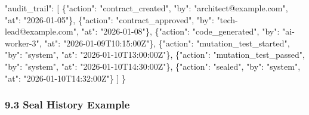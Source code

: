 \documentclass[
]{article}
\newenvironment{Shaded}{}{}
\newcommand{\DataTypeTok}[1]{\textcolor[rgb]{0.56,0.13,0.00}{#1}}
\newcommand{\FunctionTok}[1]{\textcolor[rgb]{0.02,0.16,0.49}{#1}}
\newcommand{\OtherTok}[1]{\textcolor[rgb]{0.00,0.44,0.13}{#1}}
\newcommand{\StringTok}[1]{\textcolor[rgb]{0.25,0.44,0.63}{#1}}
\begin{document}
\begin{Shaded}
\begin{Highlighting}[]
  \DataTypeTok{"audit\_trail"}\FunctionTok{:} \OtherTok{[}
    \FunctionTok{\{}\DataTypeTok{"action"}\FunctionTok{:} \StringTok{"contract\_created"}\FunctionTok{,} \DataTypeTok{"by"}\FunctionTok{:} \StringTok{"architect@example.com"}\FunctionTok{,} \DataTypeTok{"at"}\FunctionTok{:} \StringTok{"2026{-}01{-}05"}\FunctionTok{\}}\OtherTok{,}
    \FunctionTok{\{}\DataTypeTok{"action"}\FunctionTok{:} \StringTok{"contract\_approved"}\FunctionTok{,} \DataTypeTok{"by"}\FunctionTok{:} \StringTok{"tech{-}lead@example.com"}\FunctionTok{,} \DataTypeTok{"at"}\FunctionTok{:} \StringTok{"2026{-}01{-}08"}\FunctionTok{\}}\OtherTok{,}
    \FunctionTok{\{}\DataTypeTok{"action"}\FunctionTok{:} \StringTok{"code\_generated"}\FunctionTok{,} \DataTypeTok{"by"}\FunctionTok{:} \StringTok{"ai{-}worker{-}3"}\FunctionTok{,} \DataTypeTok{"at"}\FunctionTok{:} \StringTok{"2026{-}01{-}09T10:15:00Z"}\FunctionTok{\}}\OtherTok{,}
    \FunctionTok{\{}\DataTypeTok{"action"}\FunctionTok{:} \StringTok{"mutation\_test\_started"}\FunctionTok{,} \DataTypeTok{"by"}\FunctionTok{:} \StringTok{"system"}\FunctionTok{,} \DataTypeTok{"at"}\FunctionTok{:} \StringTok{"2026{-}01{-}10T13:00:00Z"}\FunctionTok{\}}\OtherTok{,}
    \FunctionTok{\{}\DataTypeTok{"action"}\FunctionTok{:} \StringTok{"mutation\_test\_passed"}\FunctionTok{,} \DataTypeTok{"by"}\FunctionTok{:} \StringTok{"system"}\FunctionTok{,} \DataTypeTok{"at"}\FunctionTok{:} \StringTok{"2026{-}01{-}10T14:30:00Z"}\FunctionTok{\}}\OtherTok{,}
    \FunctionTok{\{}\DataTypeTok{"action"}\FunctionTok{:} \StringTok{"sealed"}\FunctionTok{,} \DataTypeTok{"by"}\FunctionTok{:} \StringTok{"system"}\FunctionTok{,} \DataTypeTok{"at"}\FunctionTok{:} \StringTok{"2026{-}01{-}10T14:32:00Z"}\FunctionTok{\}}
  \OtherTok{]}
\FunctionTok{\}}
\end{Highlighting}
\end{Shaded}

\hypertarget{93-seal-history-example}{%
\subsubsection{9.3 Seal History Example}\label{93-seal-history-example}}
\end{document}
